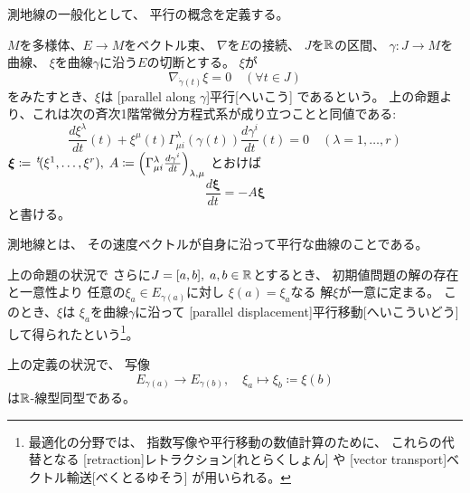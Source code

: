 \documentclass[report]{jlreq}
\begin{document}
測地線の一般化として、
平行の概念を定義する。

\begin{definition}[平行]
    $M$を多様体、$E \to M$をベクトル束、
    $\nabla$を$E$の接続、
    $J$を$\mathbb{R}$の区間、
    $\gamma \colon J \to M$を{\smooth}曲線、
    $\xi$を曲線$\gamma$に沿う$E$の切断とする。
    $\xi$が
    \begin{equation}
        \nabla_{\dot{\gamma}(t)} \xi = 0
            \quad
            (\forall t \in J)
    \end{equation}
    をみたすとき、$\xi$は
    [parallel along $\gamma$]{平行}[へいこう]
    であるという。
    上の命題より、これは次の斉次1階常微分方程式系が成り立つことと同値である:
    \begin{equation}
        \frac{d\xi^\lambda}{dt}(t)
            + \xi^\mu (t)
            \Gamma^\lambda_{\mu i} (\gamma(t))
            \frac{d\gamma^i}{dt}(t)
            = 0
            \quad
            (\lambda = 1, \ldots, r)
    \end{equation}
    $\bm{\xi} \coloneqq \,{}^{t}\!(\xi^1, \dots, \xi^r), \;
    A \coloneqq \left(
        \Gamma^{\lambda}_{\mu i} \frac{d\gamma^i}{dt}
    \right)_{\lambda, \mu}$
    とおけば
    \begin{equation}
        \frac{d\bm{\xi}}{dt} = - A \bm{\xi}
    \end{equation}
    と書ける。
\end{definition}

\begin{remark}
    測地線とは、
    その速度ベクトルが自身に沿って平行な曲線のことである。
\end{remark}

\begin{definition}[平行移動]
    上の命題の状況で
    さらに$J = [a, b], \; a, b \in \mathbb{R}$とするとき、
    初期値問題の解の存在と一意性より
    任意の$\xi_a \in E_{\gamma(a)}$に対し
    $\xi(a) = \xi_a$なる
    解$\xi$が一意に定まる。
    このとき、$\xi$は
    $\xi_a$を曲線$\gamma$に沿って
    [parallel displacement]{平行移動}[へいこういどう]
    して得られたという\footnote{
        最適化の分野では、
        指数写像や平行移動の数値計算のために、
        これらの代替となる
        [retraction]{レトラクション}[れとらくしょん]
        や
        [vector transport]{ベクトル輸送}[べくとるゆそう]
        が用いられる。
    }。
\end{definition}

\begin{proposition}
    上の定義の状況で、
    写像
    \begin{equation}
        E_{\gamma(a)} \to E_{\gamma(b)},
        \quad
        \xi_a \mapsto \xi_b \coloneqq \xi(b)
    \end{equation}
    は$\mathbb{R}$-線型同型である。
\end{proposition}
\end{document}
